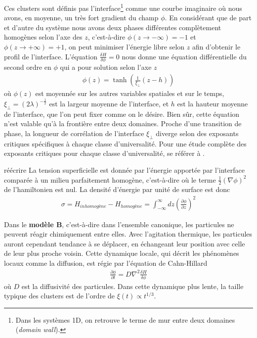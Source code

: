 Ces clusters sont définis pas l'interface\footnote{Dans les systèmes 1D, on retrouve le terme de mur entre deux domaines (\textit{domain wall}).} comme une courbe imaginaire où nous avons, en moyenne, un très fort gradient du champ $\phi$. 
En considérant que de part et d'autre du système nous avons deux phases différentes complètement homogènes selon l'axe des $z$, c'est-à-dire $\phi(z \to -\infty) = -1$ et $\phi(z \to +\infty) = +1$, on peut minimiser l'énergie libre selon $z$ afin d'obtenir le profil de l'interface. L'équation $\frac{\delta H}{\delta \phi} = 0$ nous donne une équation différentielle du second ordre en $\phi$ qui a pour solution selon l'axe $z$
\begin{align}
    \phi(z) = \tanh(\frac{1}{\xi_\perp} (z-h))
    \label{profil-phi}
\end{align}
où $\phi(z)$ est moyennée sur les autres variables spatiales et sur le temps, $\xi_\perp = (2\lambda)^{-\frac{1}{2}}$ est la largeur moyenne de l'interface, et $h$ est la hauteur moyenne de l'interface, que l'on peut fixer comme on le désire. Bien sûr, cette équation n'est valable qu'à la frontière entre deux domaines. Proche d'une transition de phase, la longueur de corrélation de l'interface $\xi_\perp$  diverge selon des exposants critiques spécifiques à chaque classe d'universalité. Pour une étude complète des exposants critiques pour chaque classe d'universalité, se référer à \cite{pelissetto_critical_2002}. 

{\color{red} réécrire}
La tension superficielle est donnée par l'énergie apportée par l'interface comparée à un milieu parfaitement homogène, c'est-à-dire où le terme $\frac{1}{2}(\nabla \phi)^2$ de l'hamiltonien est nul. La densité d'énergie par unité de surface est donc
\begin{align}
    \sigma = H_{inhomogène} - H_{homogène} = \int_{-\infty}^\infty dz \left(\frac{\partial \phi}{\partial z} \right)^2
\end{align}

Dans le \textbf{modèle B}, c'est-à-dire dans l'ensemble canonique, les particules ne peuvent réagir chimiquement entre elles. Avec l'agitation thermique, les particules auront cependant tendance à se déplacer, en échangeant leur position avec celle de leur plus proche voisin. Cette dynamique locale, qui décrit les phénomènes locaux comme la diffusion, est régie par l'équation de Cahn-Hillard\cite{cahn_free_nodate,langer_new_1975,kawasaki_growth_1978}
\begin{align}
    \frac{\partial \phi}{\partial t} = D \nabla^2 \frac{\delta H}{\delta \phi} 
    \label{cahn-hillard}
\end{align}
où $D$ est la diffusivité des particules. Dans cette dynamique plus lente, la taille typique des clusters est de l'ordre de $\xi(t) \propto t^{1/3}$.

